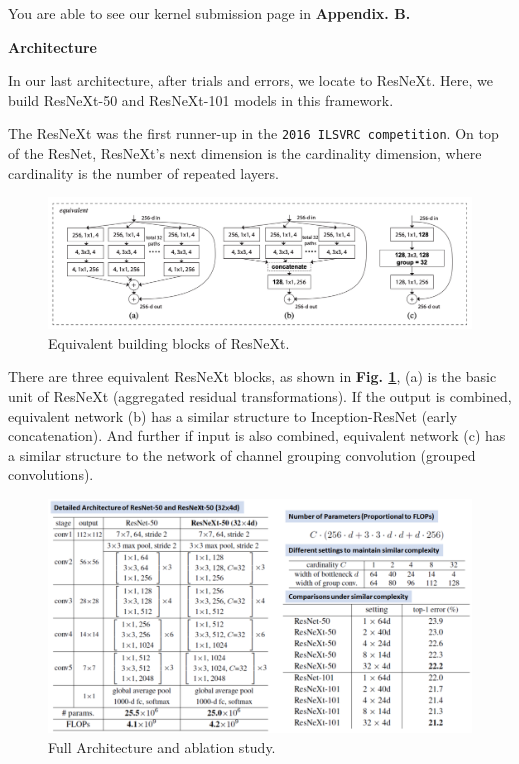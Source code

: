 \documentclass[a4paper]{article}
\begin{document}
\large{You are able to see our kernel submission page in \textbf{Appendix. B.}}

\vspace{2mm}
\begin{center}
\large\textbf{Architecture} \\
\end{center}


\large{
In our last architecture, after trials and errors, we locate to \textsf{ResNeXt}. Here, we build \textsf{ResNeXt-50} and \textsf{ResNeXt-101} models in this framework.

The \textsf{ResNeXt} was the first runner-up in the \texttt{2016 ILSVRC competition}. On top of the \textsf{ResNet}, \textsf{ResNeXt}'s next dimension is the cardinality dimension, where cardinality is the number of repeated layers.

\begin{figure}[h]
\centering
\includegraphics[width=15cm]{resnextblock.png}
\caption{Equivalent building blocks of \textsf{ResNeXt}.}
\label{resxblock}
\end{figure}

There are three equivalent \textsf{ResNeXt} blocks, as shown in \textbf{Fig. \ref{resxblock}}, (a) is the basic unit of \textsf{ResNeXt} (aggregated residual transformations). If the output is combined, equivalent network (b) has a similar structure to Inception-\textsf{ResNet} (early concatenation). And further if input is also combined, equivalent network (c) has a similar structure to the network of channel grouping convolution (grouped convolutions).

\begin{figure}[h]
\centering
\includegraphics[width=15cm]{detailedarcresX.png}
\caption{Full Architecture and ablation study.}
\label{resxblockdetailedarc}
\end{figure}

}
\end{document}
